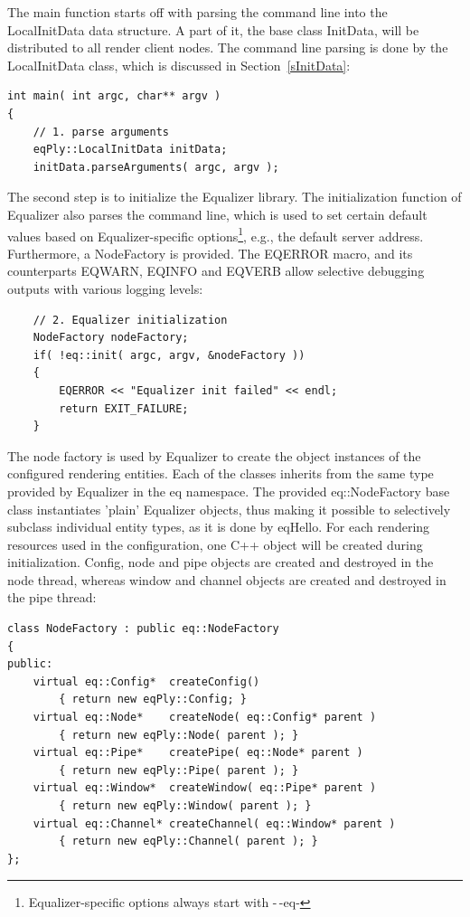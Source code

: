 \documentclass[10pt,a4]{scrartcl}
\newcommand{\sref}[1]{Section~\ref{#1}}
\begin{document}
The main function starts off with parsing the command line into the
\textsf{LocalInitData} data structure. A part of it, the base class
\textsf{InitData}, will be distributed to all render client nodes. The
command line parsing is done by the \textsf{LocalInitData} class, which
is discussed in \sref{sInitData}:

{\footnotesize\begin{lstlisting}
int main( int argc, char** argv )
{
    // 1. parse arguments
    eqPly::LocalInitData initData;
    initData.parseArguments( argc, argv );
\end{lstlisting}}

The second step is to initialize the Equalizer library. The
initialization function of Equalizer also parses the command line, which
is used to set certain default values based on Equalizer-specific
options\footnote{Equalizer-specific options always start with -\,-eq-},
e.g., the default server address. Furthermore, a \textsf{NodeFactory} is
provided. The \textsf{EQERROR} macro, and its counterparts
\textsf{EQWARN}, \textsf{EQINFO} and \textsf{EQVERB} allow selective
debugging outputs with various logging levels:

{\footnotesize\begin{lstlisting}
    // 2. Equalizer initialization
    NodeFactory nodeFactory;
    if( !eq::init( argc, argv, &nodeFactory ))
    {
        EQERROR << "Equalizer init failed" << endl;
        return EXIT_FAILURE;
    }
\end{lstlisting}}%

The node factory is used by Equalizer to create the object instances of
the configured rendering entities. Each of the classes inherits from the
same type provided by Equalizer in the \textsf{eq} namespace. The
provided \textsf{eq::NodeFactory} base class instantiates 'plain'
Equalizer objects, thus making it possible to selectively subclass
individual entity types, as it is done by \textsf{eqHello}. For each
rendering resources used in the configuration, one C++ object will be
created during initialization. Config, node and pipe objects are created and
destroyed in the node thread, whereas window and channel objects are
created and destroyed in the pipe thread:

{\footnotesize\begin{lstlisting}
class NodeFactory : public eq::NodeFactory
{
public:
    virtual eq::Config*  createConfig()  
        { return new eqPly::Config; }
    virtual eq::Node*    createNode( eq::Config* parent )  
        { return new eqPly::Node( parent ); }
    virtual eq::Pipe*    createPipe( eq::Node* parent )
        { return new eqPly::Pipe( parent ); }
    virtual eq::Window*  createWindow( eq::Pipe* parent )
        { return new eqPly::Window( parent ); }
    virtual eq::Channel* createChannel( eq::Window* parent )
        { return new eqPly::Channel( parent ); }
};
\end{lstlisting}}
\end{document}
